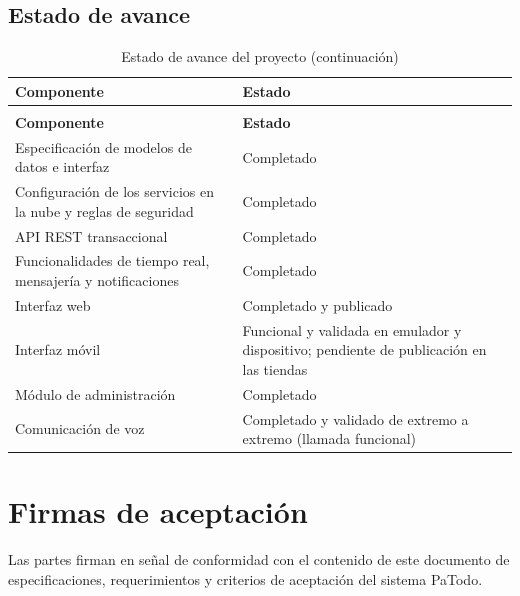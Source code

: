 \documentclass[doc,12pt,a4paper]{apa7}
\begin{document}
\subsection{Estado de avance}

\begin{longtable}{|P{5.6cm}|L{8.4cm}|}
\caption{Estado de avance del proyecto}\\
\hline
\textbf{Componente} & \textbf{Estado} \\ \hline
\endfirsthead
\caption[]{Estado de avance del proyecto (continuación)}\\
\hline
\textbf{Componente} & \textbf{Estado} \\ \hline
\endhead
\hline
\endfoot

Especificación de modelos de datos e interfaz & Completado \\ \hline
Configuración de los servicios en la nube y reglas de seguridad & Completado \\ \hline
API REST transaccional & Completado \\ \hline
Funcionalidades de tiempo real, mensajería y notificaciones & Completado \\ \hline
Interfaz web & Completado y publicado \\ \hline
Interfaz móvil & Funcional y validada en emulador y dispositivo; pendiente de publicación en las tiendas \\ \hline
Módulo de administración & Completado \\ \hline
Comunicación de voz & Completado y validado de extremo a extremo (llamada funcional) \\ \hline
\end{longtable}

\section{Firmas de aceptación}

Las partes firman en señal de conformidad con el contenido de este documento de
especificaciones, requerimientos y criterios de aceptación del sistema PaTodo.

\vspace{1cm}
\end{document}
